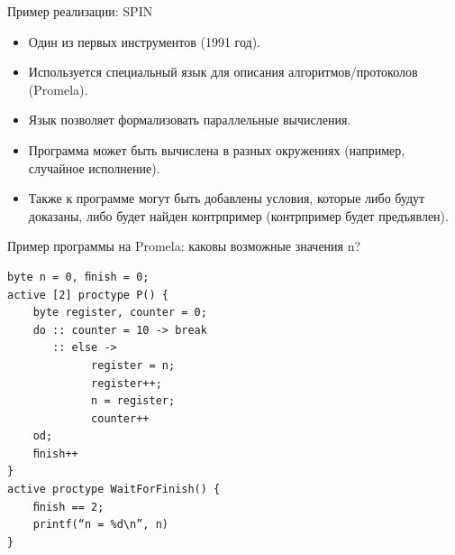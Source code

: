 \documentclass[aspectratio=169,dvipsnames,usenames]{beamer}
\begin{document}
\begin{frame}{Пример реализации: SPIN}
\begin{itemize}
\item Один из первых инструментов (1991 год).
\item Используется специальный язык для описания алгоритмов/протоколов (Promela).
\item Язык позволяет формализовать параллельные вычисления.
\item Программа может быть вычислена в разных окружениях (например, случайное исполнение).
\item Также к программе могут быть добавлены условия, которые либо будут доказаны, либо
будет найден контрпример (контрпример будет предъявлен).
\end{itemize}
\end{frame}

\begin{frame}[fragile]{Пример программы на Promela: каковы возможные значения n?}
\begin{verbatim}
byte n = 0, ﬁnish = 0;
active [2] proctype P() {
    byte register, counter = 0;
    do :: counter = 10 -> break
       :: else ->
             register = n;
             register++;
             n = register;
             counter++
    od;
    ﬁnish++
}
active proctype WaitForFinish() {
    ﬁnish == 2;
    printf(“n = %d\n”, n)
}
\end{verbatim}
\end{frame}

\end{document}
